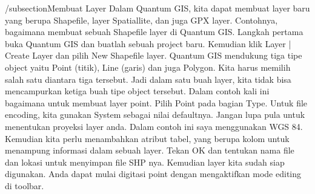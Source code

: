 /subsection{Membuat Layer}
    Dalam Quantum GIS, kita dapat membuat layer baru yang berupa Shapefile, layer Spatiallite, dan juga GPX layer. Contohnya, bagaimana membuat sebuah Shapefile layer di Quantum GIS. 
    Langkah pertama buka Quantum GIS dan buatlah sebuah project baru. Kemudian klik Layer | Create Layer dan pilih New Shapefile layer. Quantum GIS mendukung  tiga tipe object yaitu Point (titik), Line (garis) dan juga Polygon. Kita harus memilih salah satu diantara tiga tersebut. Jadi dalam satu buah layer, kita tidak bisa mencampurkan ketiga buah tipe object tersebut. Dalam contoh kali ini bagaimana untuk membuat layer point. Pilih Point pada bagian Type. Untuk file encoding, kita gunakan System sebagai nilai defaultnya. Jangan lupa pula untuk menentukan proyeksi layer anda. Dalam contoh ini saya menggunakan WGS 84.  
    Kemudian kita perlu menambahkan atribut tabel, yang berupa kolom untuk menampung informasi dalam sebuah layer.
    Tekan OK dan tentukan nama file dan lokasi untuk menyimpan file SHP nya. Kemudian layer kita sudah siap digunakan. Anda dapat mulai digitasi point dengan mengaktifkan mode editing di toolbar. 
